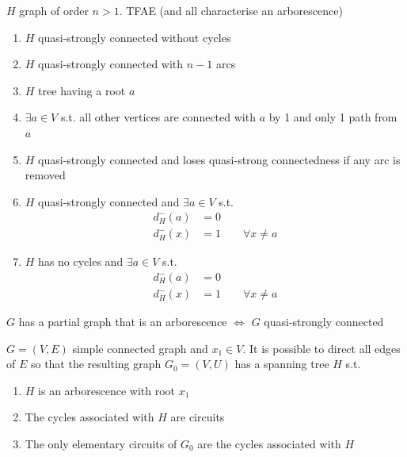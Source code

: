 \documentclass[aspectratio=169]{beamer}\usepackage[]{graphicx}\usepackage[]{xcolor}
\begin{document}
\begin{frame}
\begin{theorem}
$H$ graph of order $n>1$. TFAE (and all characterise an arborescence)
\begin{enumerate}
\item $H$ quasi-strongly connected without cycles
\item $H$ quasi-strongly connected with $n-1$ arcs
\item $H$ tree having a root $a$
\item $\exists a\in V$ s.t. all other vertices are connected with $a$ by 1 and only 1 path from $a$
\item $H$ quasi-strongly connected and loses quasi-strong connectedness if any arc is removed
\item $H$ quasi-strongly connected and $\exists a\in V$ s.t.
\begin{align*}
d_H^-(a)&=0 \\
d_H^-(x)&=1\qquad \forall x\neq a
\end{align*}
\item $H$ has no cycles and $\exists a\in V$ s.t.
\begin{align*}
d_H^-(a)&=0 \\
d_H^-(x)&=1\qquad \forall x\neq a
\end{align*}
\end{enumerate}
\end{theorem}
\end{frame}


\begin{frame}
\begin{theorem}
$G$ has a partial graph that is an arborescence $\iff$ $G$ quasi-strongly connected
\end{theorem}
\vfill
\begin{theorem}
$G=(V,E)$ simple connected graph and $x_1\in V$. It is possible to direct all edges of $E$ so that the resulting graph $G_0=(V,U)$ has a spanning tree $H$ s.t.
\begin{enumerate}
	\item $H$ is an arborescence with root $x_1$
	\item The cycles associated with $H$ are circuits
	\item The only elementary circuits of $G_0$ are the cycles associated with $H$
\end{enumerate}
\end{theorem}
\end{frame}
\end{document}
